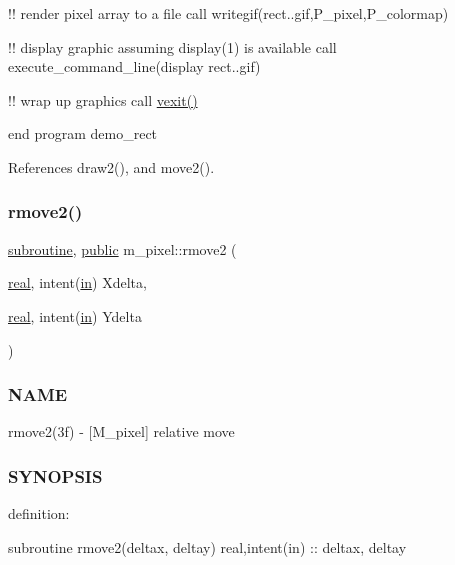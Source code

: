 !! render pixel array to a file call writegif(\textquotesingle{}rect..\+gif\textquotesingle{},P\+\_\+pixel,P\+\_\+colormap)

!! display graphic assuming display(1) is available call execute\+\_\+command\+\_\+line(\textquotesingle{}display rect..\+gif\textquotesingle{})

!! wrap up graphics call \hyperlink{namespacem__pixel_a19ad6b65752322b0029a62cc0ebec3e8}{vexit()}

end program demo\+\_\+rect 

References draw2(), and move2().

\mbox{\label{namespacem__pixel_a9b0fb9ccafe605fd6daf50c74347ed3a}} 
\subsubsection{\texorpdfstring{rmove2()}{rmove2()}}
{\footnotesize\ttfamily \hyperlink{M__stopwatch_83_8txt_acfbcff50169d691ff02d4a123ed70482}{subroutine}, \hyperlink{M__stopwatch_83_8txt_a2f74811300c361e53b430611a7d1769f}{public} m\+\_\+pixel\+::rmove2 (\begin{DoxyParamCaption}\item[{\hyperlink{read__watch_83_8txt_abdb62bde002f38ef75f810d3a905a823}{real}, intent(\hyperlink{M__journal_83_8txt_afce72651d1eed785a2132bee863b2f38}{in})}]{Xdelta,  }\item[{\hyperlink{read__watch_83_8txt_abdb62bde002f38ef75f810d3a905a823}{real}, intent(\hyperlink{M__journal_83_8txt_afce72651d1eed785a2132bee863b2f38}{in})}]{Ydelta }\end{DoxyParamCaption})}



\subsubsection*{N\+A\+ME}

rmove2(3f) -\/ \mbox{[}M\+\_\+pixel\mbox{]} relative move 

\subsubsection*{S\+Y\+N\+O\+P\+S\+IS}

definition\+:

subroutine rmove2(deltax, deltay) real,intent(in) \+:\+: deltax, deltay

